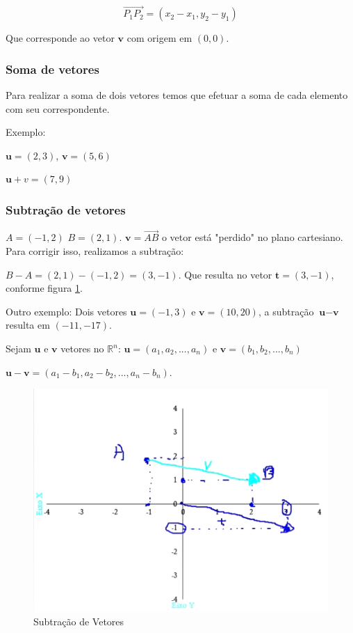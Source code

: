 \documentclass[12pt]{article}
\begin{document}
\begin{equation}
\overrightarrow{P_{1}P_{2}} = (x_{2}-x_{1}, y_{2} - y_{1})
\end{equation}

Que corresponde ao vetor \(\textbf{v}\) com origem em \((0, 0)\).

\subsubsection{Soma de vetores}

Para realizar a soma de dois vetores temos que efetuar a soma de cada elemento com seu correspondente.

Exemplo:

\(\textbf{u} = (2, 3)\), \(\textbf{v} = (5, 6)\)

\(\textbf{u} + v = (7, 9)\)

\subsubsection{Subtração de vetores}

\(A = (-1, 2)\)   \(B = (2,1)\). \(\textbf{v} = \overrightarrow{AB}\) o vetor está "perdido" no plano cartesiano. Para corrigir isso, realizamos a subtração:

\(B - A = (2, 1) - ( -1, 2) = (3, -1)\). Que resulta no vetor \(\textbf{t} = (3, -1)\), conforme figura \ref{fig:subtracaovetores01}.

Outro exemplo: Dois vetores \(\textbf{u} = (-1, 3)\) e \(\textbf{v} = (10, 20)\), a subtração \(\textbf{u} - \textbf{v}\) resulta em \((-11, -17)\).

Sejam \(\textbf{u}\) e \(\textbf{v}\) vetores no \(\mathbb{R}^n\)\cite{lipschutz-algebra}: \(\textbf{u}=(a_{1}, a_{2},...,a_{n})\) e \(\textbf{v}=(b_{1}, b_{2},...,b_{n})\)

\(\textbf{u}-\textbf{v} = (a_{1} - b_{1}, a_{2}-b_{2},...,a_{n}-b_{n})\).

\begin{figure}
	\centering
	\includegraphics[width=0.7\linewidth]{figuras/subtracao_vetores_01}
	\caption[Subtração de Vetores]{Subtração de Vetores}
	\label{fig:subtracaovetores01}
\end{figure}
\end{document}
